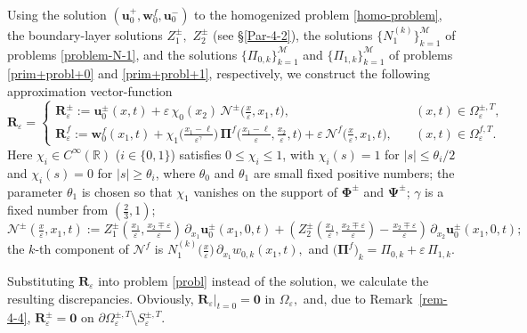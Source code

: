 \documentclass[reqno]{amsart}            %
\numberwithin{equation}{section}
\begin{document}
	Using the solution $(\mathbf{u}^+_0, \mathbf{w}^f_0, \mathbf{u}^-_0)$ to the homogenized problem \eqref{homo-problem}, the boundary-layer solutions $Z^\pm_1,$ $Z^\pm_2$ (see \S \ref{Par-4-2}),  the solutions $\{N^{(k)}_1\}_{k=1}^{\mathcal{M}}$ of problems \eqref{problem-N-1},  and the solutions $\{\Pi_{0, k}\}_{k=1}^{\mathcal{M}}$ and $\{\Pi_{1, k}\}_{k=1}^{\mathcal{M}}$ of problems  \eqref{prim+probl+0} and \eqref{prim+probl+1}, respectively,  we construct the following approximation vector-function
	\begin{equation}\label{app-functions}
		\mathbf{R}_\varepsilon =
		\left\{\begin{array}{ll}
			\mathbf{R}_\varepsilon^\pm := \mathbf{u}^\pm_0(x,t) + \varepsilon \, \chi_0(x_2) \, \boldsymbol{\mathcal{N}}^\pm\big(\tfrac{x}{\varepsilon},x_1,t\big), & \quad (x,t) \in 
			\Omega^{\pm, T}_\varepsilon,
			\\[4pt]
			\mathbf{R}_\varepsilon^f := \mathbf{w}^f_0(x_1,t) + \chi_{1}\big(\frac{x_1 -\ell}{\varepsilon^\gamma}\big) \, \boldsymbol{\Pi}^f\big(\tfrac{x_1 - \ell}{\varepsilon}, \tfrac{x_2}{\varepsilon}, t\big) + \varepsilon \, \boldsymbol{\mathcal{N}}^f\big(\tfrac{x}{\varepsilon},x_1,t\big),& \quad (x,t) \in 
			\Omega^{f, T}_\varepsilon.
		\end{array}\right.
	\end{equation}
	Here $\chi_i \in C^\infty(\mathbb{R})$ ($i \in \{0,1\}$) satisfies $0 \leq \chi_i \leq 1$, with $\chi_i(s) = 1$ for $|s| \leq \theta_i/2$ and $\chi_i(s) = 0$ for $|s| \geq \theta_i$, where $\theta_0$ and $\theta_1$ are small fixed positive numbers; the parameter $\theta_1$ is chosen so that $\chi_1$ vanishes on the support of $\boldsymbol{\Phi}^\pm$ and $\boldsymbol{\Psi}^\pm$;  $\gamma$ is a fixed number from $(\tfrac{2}{3}, 1)$;
	\[
	\boldsymbol{\mathcal{N}}^\pm\!\left(\tfrac{x}{\varepsilon},x_1,t\right) :=
	Z^\pm_1\!\left(\tfrac{x_1}{\varepsilon}, \tfrac{x_2 \mp \varepsilon}{\varepsilon}\right)\, \partial_{x_1}\mathbf{u}^\pm_0(x_1,0,t)
	+ \left(Z^\pm_2\!\left(\tfrac{x_1}{\varepsilon}, \tfrac{x_2 \mp \varepsilon}{\varepsilon}\right) - \tfrac{x_2 \mp \varepsilon}{\varepsilon}\right)\, \partial_{x_2}\mathbf{u}^\pm_0(x_1,0,t);
	\]
	the $k$-th component of $\boldsymbol{\mathcal{N}}^f$ is
	$N^{(k)}_1\big(\tfrac{x}{\varepsilon}\big) \, \partial_{x_1}w_{0,k}(x_1,t),$ and $\big(\boldsymbol{\Pi}^f\big)_k = \Pi_{0, k} + \varepsilon\, \Pi_{1, k}.$
	
	
	Substituting $\mathbf{R}_\varepsilon$ into problem \eqref{probl} instead of the solution, we 
	calculate the resulting discrepancies. Obviously, $\mathbf{R}_\varepsilon\big|_{t=0}= \mathbf{0}$ in $\Omega_{\varepsilon},$ and, 
	due to Remark~\ref{rem-4-4}, $\mathbf{R}_\varepsilon^\pm  = \mathbf{0}$ on $\partial\Omega^{\pm, T}_\varepsilon \setminus S^{\pm, T}_\varepsilon.$
	
\end{document}
